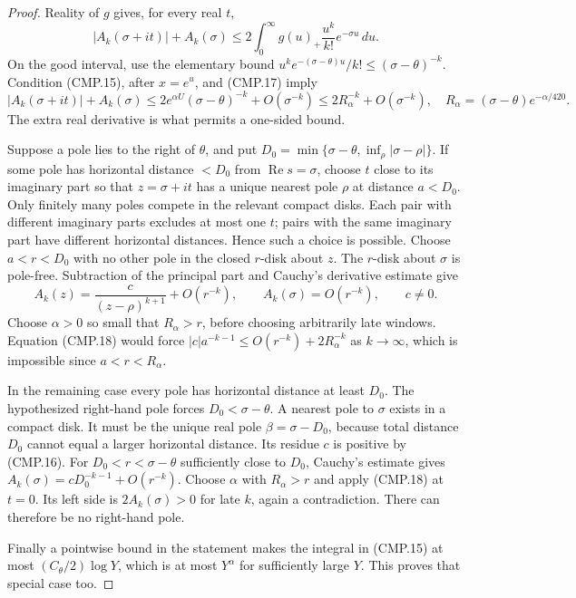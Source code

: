 \documentclass[11pt,a4paper]{article}
\numberwithin{equation}{section}
\theoremstyle{remark}\newtheorem{remark}[theorem]{Remark}
\begin{document}
\begin{proof}
Reality of $g$ gives, for every real $t$,
\[
 |A_k(\sigma+it)|+A_k(\sigma)
       \le2\int_0^\infty g(u)_+\frac{u^k}{k!}e^{-\sigma u}\,\allowbreak{} du.
\]
On the good interval, use the elementary bound
$u^ke^{-(\sigma-\theta)u}/k!\le(\sigma-\theta)^{-k}$.
Condition (CMP.15), after $x=e^u$, and (CMP.17) imply
\[
 |A_k(\sigma+it)|+A_k(\sigma)
       \le2e^{\alpha U}(\sigma-\theta)^{-k}+O(\sigma^{-k})
       \le2R_\alpha^{-k}+O(\sigma^{-k}),
 \quad R_\alpha=(\sigma-\theta)e^{-\alpha/420}.
                                                               \tag{CMP.18}
\]
The extra real derivative is what permits a one-sided bound.

Suppose a pole lies to the right of $\theta$, and put
$D_0=\min\{\sigma-\theta,\inf_\rho|\sigma-\rho|\}$.
If some pole has horizontal distance $<D_0$ from
$\operatorname{Re}s=\sigma$, choose $t$ close to its imaginary
part so that $z=\sigma+it$ has a unique nearest pole $\rho$
at distance $a<D_0$.  Only finitely many poles compete in the
relevant compact disks.  Each pair with different imaginary parts
excludes at most one $t$; pairs with the same imaginary part have
different horizontal distances.  Hence such a choice is possible.
Choose $a<r<D_0$ with no other pole in the closed $r$-disk about
$z$.  The $r$-disk about $\sigma$ is pole-free.  Subtraction of
the principal part and Cauchy's derivative estimate give
\[
 A_k(z)=\frac{c}{(z-\rho)^{k+1}}+O(r^{-k}),\qquad
 A_k(\sigma)=O(r^{-k}),\qquad c\ne0.
\]
Choose $\alpha>0$ so small that $R_\alpha>r$, before choosing
arbitrarily late windows.  Equation (CMP.18) would force
$|c|a^{-k-1}\le O(r^{-k})+2R_\alpha^{-k}$ as $k\to\infty$,
which is impossible since $a<r<R_\alpha$.

In the remaining case every pole has horizontal distance at least
$D_0$.  The hypothesized right-hand pole forces
$D_0<\sigma-\theta$.  A nearest pole to $\sigma$ exists in a
compact disk.  It must be the unique real pole
$\beta=\sigma-D_0$, because total distance $D_0$ cannot equal a
larger horizontal distance.  Its residue $c$ is positive by
(CMP.16).  For $D_0<r<\sigma-\theta$ sufficiently close to
$D_0$, Cauchy's estimate gives
$A_k(\sigma)=cD_0^{-k-1}+O(r^{-k})$.
Choose $\alpha$ with $R_\alpha>r$ and apply (CMP.18) at $t=0$.
Its left side is $2A_k(\sigma)>0$ for late $k$, again a
contradiction.  There can therefore be no right-hand pole.

Finally a pointwise bound in the statement makes the integral in
(CMP.15) at most $(C_\theta/2)\log Y$, which is at most
$Y^\alpha$ for sufficiently large $Y$.  This proves that
special case too.
\end{proof}
\end{document}
